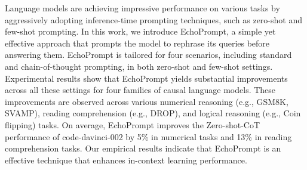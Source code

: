 Language models are achieving impressive performance on various tasks by aggressively adopting inference-time prompting techniques, such as zero-shot and few-shot prompting. In this work, we introduce EchoPrompt, a simple yet effective approach that prompts the model to rephrase its queries before answering them. EchoPrompt is tailored for four scenarios, including standard and chain-of-thought prompting, in both zero-shot and few-shot settings. Experimental results show that EchoPrompt yields substantial improvements across all these settings for four families of causal language models. These improvements are observed across various numerical reasoning (e.g., GSM8K, SVAMP), reading comprehension (e.g., DROP), and logical reasoning (e.g., Coin flipping) tasks. On average, EchoPrompt improves the Zero-shot-CoT performance of code-davinci-002 by 5\% in numerical tasks and 13\% in reading comprehension tasks. Our empirical results indicate that EchoPrompt is an effective technique that enhances in-context learning performance.